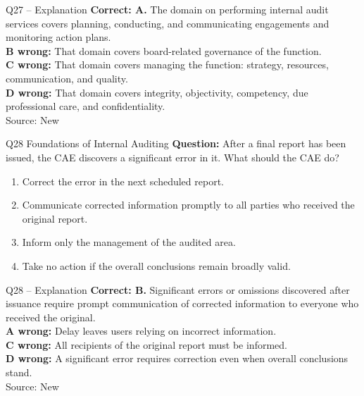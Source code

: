 \documentclass[aspectratio=169,10pt]{beamer}
\begin{document}
\begin{frame}[t]{Q27 -- Explanation}
	\footnotesize
	\textbf{Correct: A.} The domain on performing internal audit services covers planning, conducting, and communicating engagements and monitoring action plans. \\[5pt]
\textbf{B wrong:} That domain covers board-related governance of the function. \\[3pt]
\textbf{C wrong:} That domain covers managing the function: strategy, resources, communication, and quality. \\[3pt]
\textbf{D wrong:} That domain covers integrity, objectivity, competency, due professional care, and confidentiality. \\[3pt]
	\vfill {\tiny Source: New}
\end{frame}

\begin{frame}[t]{Q28 \hfill {\scriptsize Foundations of Internal Auditing}}
	\small
	\textbf{Question:} After a final report has been issued, the CAE discovers a significant error in it. What should the CAE do?
	\begin{enumerate}[label=\Alph*.,itemsep=1pt,topsep=3pt]
			\item Correct the error in the next scheduled report.
			\item Communicate corrected information promptly to all parties who received the original report.
			\item Inform only the management of the audited area.
			\item Take no action if the overall conclusions remain broadly valid.
	\end{enumerate}
\end{frame}

\begin{frame}[t]{Q28 -- Explanation}
	\footnotesize
	\textbf{Correct: B.} Significant errors or omissions discovered after issuance require prompt communication of corrected information to everyone who received the original. \\[5pt]
\textbf{A wrong:} Delay leaves users relying on incorrect information. \\[3pt]
\textbf{C wrong:} All recipients of the original report must be informed. \\[3pt]
\textbf{D wrong:} A significant error requires correction even when overall conclusions stand. \\[3pt]
	\vfill {\tiny Source: New}
\end{frame}
\end{document}
